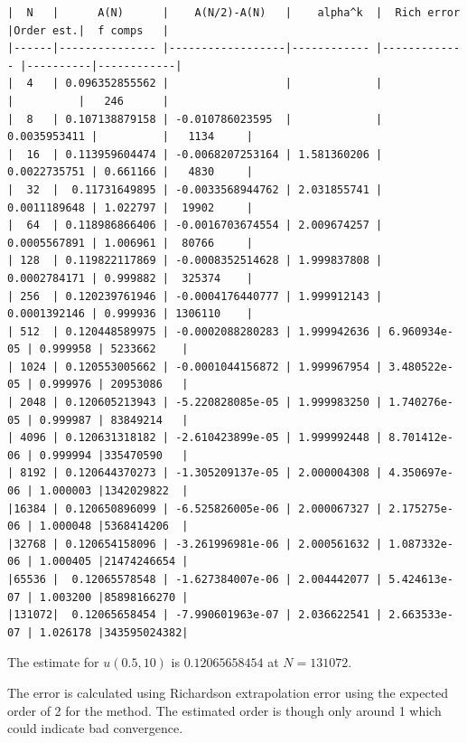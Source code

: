 \documentclass{article}
\begin{document}
\begin{verbatim}
|  N   |      A(N)      |    A(N/2)-A(N)   |    alpha^k  |  Rich error  |Order est.|  f comps   |
|------|--------------- |------------------|------------ |------------- |----------|------------|
|  4   | 0.096352855562 |                  |             |              |          |   246      |
|  8   | 0.107138879158 | -0.010786023595  |             | 0.0035953411 |          |   1134     |
|  16  | 0.113959604474 | -0.0068207253164 | 1.581360206 | 0.0022735751 | 0.661166 |   4830     |
|  32  |  0.11731649895 | -0.0033568944762 | 2.031855741 | 0.0011189648 | 1.022797 |  19902     |
|  64  | 0.118986866406 | -0.0016703674554 | 2.009674257 | 0.0005567891 | 1.006961 |  80766     |
| 128  | 0.119822117869 | -0.0008352514628 | 1.999837808 | 0.0002784171 | 0.999882 |  325374    |
| 256  | 0.120239761946 | -0.0004176440777 | 1.999912143 | 0.0001392146 | 0.999936 | 1306110    |
| 512  | 0.120448589975 | -0.0002088280283 | 1.999942636 | 6.960934e-05 | 0.999958 | 5233662    |
| 1024 | 0.120553005662 | -0.0001044156872 | 1.999967954 | 3.480522e-05 | 0.999976 | 20953086   |
| 2048 | 0.120605213943 | -5.220828085e-05 | 1.999983250 | 1.740276e-05 | 0.999987 | 83849214   |
| 4096 | 0.120631318182 | -2.610423899e-05 | 1.999992448 | 8.701412e-06 | 0.999994 |335470590   |
| 8192 | 0.120644370273 | -1.305209137e-05 | 2.000004308 | 4.350697e-06 | 1.000003 |1342029822  |
|16384 | 0.120650896099 | -6.525826005e-06 | 2.000067327 | 2.175275e-06 | 1.000048 |5368414206  |
|32768 | 0.120654158096 | -3.261996981e-06 | 2.000561632 | 1.087332e-06 | 1.000405 |21474246654 |
|65536 |  0.12065578548 | -1.627384007e-06 | 2.004442077 | 5.424613e-07 | 1.003200 |85898166270 |
|131072|  0.12065658454 | -7.990601963e-07 | 2.036622541 | 2.663533e-07 | 1.026178 |343595024382|
\end{verbatim}

The estimate for $u(0.5,10)$ is $0.12065658454$ at $N=131072$.

The error is calculated using Richardson extrapolation error using the expected order of 2 for the method. 
The estimated order is though only around 1 which could indicate bad convergence.
\end{document}
